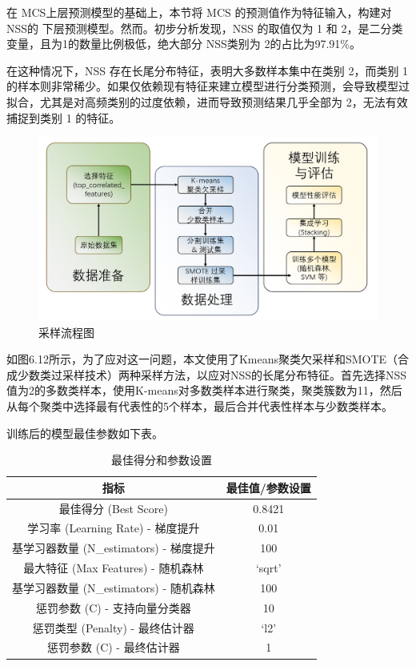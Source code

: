 \documentclass[bwprint]{gmcmthesis}
\begin{document}
在 MCS上层预测模型的基础上，本节将 MCS 的预测值作为特征输入，构建对 NSS的 下层预测模型。然而。初步分析发现，NSS 的取值仅为 1 和 2，是二分类变量，且为1的数量比例极低，绝大部分 NSS类别为 2的占比为97.91\%。


在这种情况下，NSS 存在长尾分布特征，表明大多数样本集中在类别 2，而类别 1 的样本则非常稀少。如果仅依赖现有特征来建立模型进行分类预测，会导致模型过拟合，尤其是对高频类别的过度依赖，进而导致预测结果几乎全部为 2，无法有效捕捉到类别 1 的特征。


\begin{figure}[H]
	\centering
	\includegraphics[width=0.7\linewidth]{figures/问题2采样流程}
	\caption{采样流程图}
	\label{fig:2}
\end{figure}

如图6.12所示，为了应对这一问题，本文使用了Kmeans聚类欠采样和SMOTE（合成少数类过采样技术）两种采样方法，以应对NSS的长尾分布特征。首先选择NSS值为2的多数类样本，使用K-means对多数类样本进行聚类，聚类簇数为11，然后从每个聚类中选择最有代表性的5个样本，最后合并代表性样本与少数类样本。

训练后的模型最佳参数如下表。

\begin{table}[H]
	\centering
	\caption{最佳得分和参数设置}
	\begin{tabular}{cc}
		\toprule
		指标 & 最佳值/参数设置 \\
		\midrule
		最佳得分 (Best Score) & 0.8421 \\
		学习率 (Learning Rate) - 梯度提升 & 0.01 \\
		基学习器数量 (N\_estimators) - 梯度提升 & 100 \\
		最大特征 (Max Features) - 随机森林 & `sqrt' \\
		基学习器数量 (N\_estimators) - 随机森林 & 100 \\
		惩罚参数 (C) - 支持向量分类器 & 10 \\
		惩罚类型 (Penalty) - 最终估计器 & `l2' \\
		惩罚参数 (C) - 最终估计器 & 1 \\
		\bottomrule
	\end{tabular}
\end{table}
\end{document}
